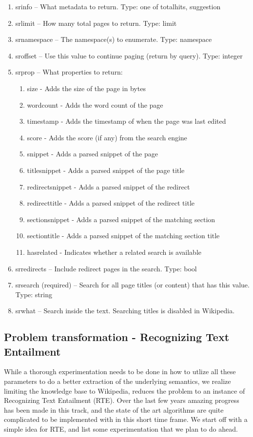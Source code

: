 \documentclass[12pt]{article}
\begin{document}
\begin{enumerate}
\item    srinfo – What metadata to return. Type: one of totalhits, suggestion
\item    srlimit – How many total pages to return. Type: limit
\item    srnamespace – The namespace(s) to enumerate. Type: namespace
\item    sroffset – Use this value to continue paging (return by query). Type: integer
\item    srprop – What properties to return:
\begin{enumerate}
\item    size - Adds the size of the page in bytes
\item    wordcount - Adds the word count of the page
\item    timestamp - Adds the timestamp of when the page was last edited
\item    score - Adds the score (if any) from the search engine
\item    snippet - Adds a parsed snippet of the page
\item    titlesnippet - Adds a parsed snippet of the page title
\item    redirectsnippet - Adds a parsed snippet of the redirect
\item    redirecttitle - Adds a parsed snippet of the redirect title
\item    sectionsnippet - Adds a parsed snippet of the matching section
\item    sectiontitle - Adds a parsed snippet of the matching section title
\item    hasrelated - Indicates whether a related search is available
\end{enumerate}
\item    srredirects – Include redirect pages in the search. Type: bool
\item    srsearch (required) – Search for all page titles (or content) that has this value. Type: string
\item    srwhat – Search inside the text. Searching titles is disabled in Wikipedia.
\end{enumerate}


\subsection{Problem transformation - Recognizing Text Entailment}
While a thorough experimentation needs to be done in how to utlize all these parameters to do a better extraction of the underlying semantics, we realize limiting the knowledge base to Wikipedia, reduces the problem to an instance of Recognizing Text Entailment (RTE). Over the last few years amazing progress has been made in this track, and the state of the art algorithms are quite complicated to be implemented with in this short time frame. We start off with a simple idea for RTE, and list some experimentation that we plan to do ahead. 
\end{document}
